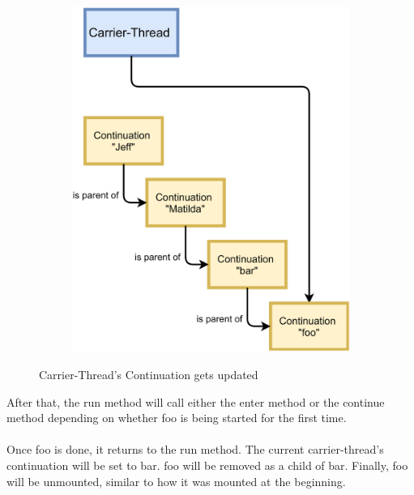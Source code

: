 \begin{figure}[H]
\begin{subfigure}[b]{0.45\textwidth}
        \includegraphics[width=1.0\linewidth]{img/after-run-changes-current-continuation.png}
        \label{After Carrier-Thread's Continuation gets updated}
    \end{subfigure}
    \caption{Carrier-Thread's Continuation gets updated}
\end{figure}

After that, the run method will call either the enter method or the continue method depending on whether foo is being started for the first time.
\\
\\
Once foo is done, it returns to the run method. The current carrier-thread's continuation will be set to bar. foo will be removed as a child of bar. Finally, foo will be unmounted, similar to how it was mounted at the beginning.

